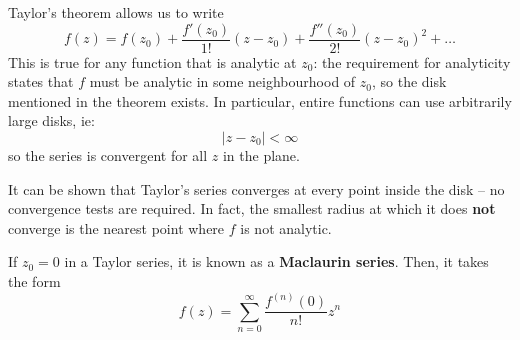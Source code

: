\documentclass{article}
\renewcommand{\emph}{\textbf}
\begin{document}
Taylor's theorem allows us to write
\[
	f(z) = f(z_0) 
	+ \frac{f'(z_0)}{1!}  (z - z_0)
	+ \frac{f''(z_0)}{2!} (z - z_0)^2
	+ \dots 
\]
This is true for any function that is analytic at $z_0$: the requirement for analyticity states that $f$ must be analytic in some neighbourhood of $z_0$, so the disk mentioned in the theorem exists. In particular, entire functions can use arbitrarily large disks, ie:
\[
	|z - z_0| < \infty
\]
so the series is convergent for all $z$ in the plane.

It can be shown that Taylor's series converges at every point inside the disk -- no convergence tests are required. In fact, the smallest radius at which it does \emph{not} converge is the nearest point where $f$ is not analytic. 

If $z_0 = 0$ in a Taylor series, it is known as a \emph{Maclaurin series}. Then, it takes the form
\[
	f(z) = \sum_{n=0}^\infty \frac{f^{(n)}(0)}{n!} z^n
\]
\end{document}
